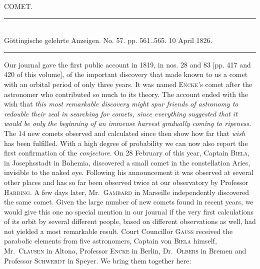 \clearpage
{}
\hypertarget{native-456-comet}{}
\begin{center}
{\large COMET.}
\end{center}

\begin{center}
\rule{6cm}{0.4pt}\\
Göttingische gelehrte Anzeigen. No. 57. pp. 561..565. 10 April 1826.\\
\rule{6cm}{0.4pt}
\end{center}

Our journal gave the first public account in 1819, in nos. 28 and 83 [pp. 417 and 420 of this volume], of the important discovery that made known to us a comet with an orbital period of only three years. It was named \textsc{Encke}’s comet after the astronomer who contributed so much to its theory. The account ended with the wish that \emph{this most remarkable discovery might spur friends of astronomy to redouble their zeal in searching for comets, since everything suggested that it would be only the beginning of an immense harvest gradually coming to ripeness.} The 14 new comets observed and calculated since then show how far that \emph{wish} has been fulfilled. With a high degree of probability we can now also report the first confirmation of the \emph{conjecture}. On 28 February of this year, Captain \textsc{Biela}, in Josephsstadt in Bohemia, discovered a small comet in the constellation Aries, invisible to the naked eye. Following his announcement it was observed at several other places and has so far been observed twice at our observatory by Professor \textsc{Harding}. A few days later, Mr.\ \textsc{Gambard} in Marseille independently discovered the same comet. Given the large number of new comets found in recent years, we would give this one no special mention in our journal if the very first calculations of its orbit by several different people, based on different observations as well, had not yielded a most remarkable result. Court Councillor \textsc{Gauss} received the parabolic elements from five astronomers, Captain von \textsc{Biela} himself, Mr.\ \textsc{Clausen} in Altona, Professor \textsc{Encke} in Berlin, Dr.\ \textsc{Olbers} in Bremen and Professor \textsc{Schwerdt} in Speyer. We bring them together here:

